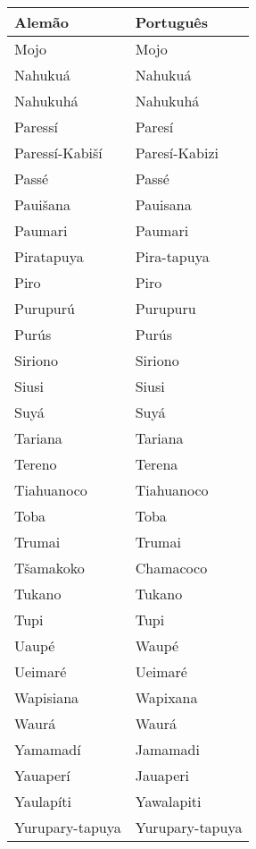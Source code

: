 \pagebreak

\begin{center}
\begin{tabular}{ | m{11em} | m{4.2cm}| } 
\hline
\textbf{Alemão} & \textbf{Português} \\ [0.5ex] 
\hline\hline
Mojo              	       	& Mojo \\
\hline
Nahukuá           	       	& Nahukuá \\
\hline
Nahukuhá          	       	& Nahukuhá \\
\hline
Paressí           	       	& Paresí \\
\hline
Paressí-Kabiší    	       	& Paresí-Kabizi \\
\hline
Passé             	       	& Passé \\
\hline
Pauišana          	       	& Pauisana \\
\hline
Paumari           	       	& Paumari \\
\hline
Piratapuya        	       	& Pira-tapuya \\
\hline
Piro              	       	& Piro \\
\hline
Purupurú          	       	& Purupuru \\
\hline
Purús             	       	& Purús \\
\hline
Siriono           	       	& Siriono \\
\hline
Siusi             	       	& Siusi \\
\hline
Suyá              	       	& Suyá \\
\hline
Tariana           	       	& Tariana \\
\hline
Tereno            	       	& Terena \\
\hline
Tiahuanoco        	       	& Tiahuanoco \\
\hline
Toba              	       	& Toba \\
\hline
Trumai            	       	& Trumai \\
\hline
Tšamakoko         	       	& Chamacoco \\
\hline
Tukano            	       	& Tukano \\
\hline
Tupi              	       	& Tupi \\
\hline
Uaupé             	       	& Waupé \\
\hline
Ueimaré           	       	& Ueimaré \\
\hline
Wapisiana         	       	& Wapixana \\
\hline
Waurá             	       	& Waurá \\
\hline
Yamamadí          	       	& Jamamadi \\
\hline
Yauaperí          	       	& Jauaperi \\
\hline
Yaulapíti         	       	& Yawalapiti \\
\hline
Yurupary-tapuya   	       	& Yurupary-tapuya\\
\hline
\end{tabular}
\end{center}

